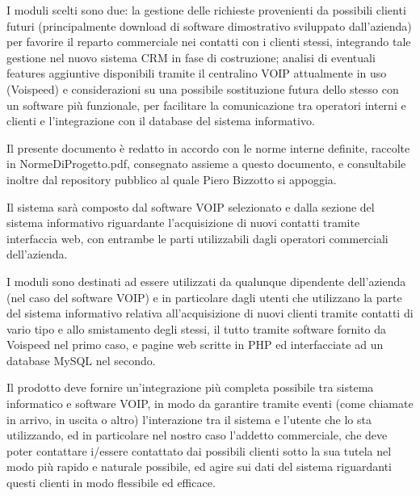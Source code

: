 I moduli scelti sono due: la gestione delle richieste provenienti da possibili clienti futuri (principalmente download di software dimostrativo sviluppato dall'azienda) per favorire il reparto commerciale nei contatti con i clienti stessi, integrando tale gestione nel nuovo sistema CRM in fase di costruzione; analisi di eventuali features aggiuntive disponibili tramite il centralino VOIP attualmente in uso (Voispeed) e considerazioni su una possibile sostituzione futura dello stesso con un software pi\`u funzionale, per facilitare la comunicazione tra operatori interni e clienti e l'integrazione con il database del sistema informativo.

Il presente documento \`e redatto in accordo con le norme interne definite, raccolte in NormeDiProgetto.pdf, consegnato assieme a questo documento, e consultabile inoltre dal repository pubblico al quale Piero Bizzotto si appoggia.



Il sistema sar\`a composto dal software VOIP selezionato e dalla sezione del sistema informativo riguardante l'acquisizione di nuovi contatti tramite interfaccia web, con entrambe le parti utilizzabili dagli operatori commerciali dell'azienda. 

I moduli sono destinati ad essere utilizzati da qualunque dipendente dell'azienda (nel caso del software VOIP) e in particolare dagli utenti che utilizzano la parte del sistema informativo relativa all'acquisizione di nuovi clienti tramite contatti di vario tipo e allo smistamento degli stessi, il tutto tramite software fornito da Voispeed nel primo caso, e pagine web scritte in PHP ed interfacciate ad un database MySQL nel secondo.

Il prodotto deve fornire un'integrazione pi\`u completa possibile tra sistema informatico e software VOIP, in modo da garantire tramite eventi (come chiamate in arrivo, in uscita o altro) l'interazione tra il sistema e l'utente che lo sta utilizzando, ed in particolare nel nostro caso l'addetto commerciale, che deve poter contattare i/essere contattato dai possibili clienti sotto la sua tutela nel modo pi\`u rapido e naturale possibile, ed agire sui dati del sistema riguardanti questi clienti in modo flessibile ed efficace.

